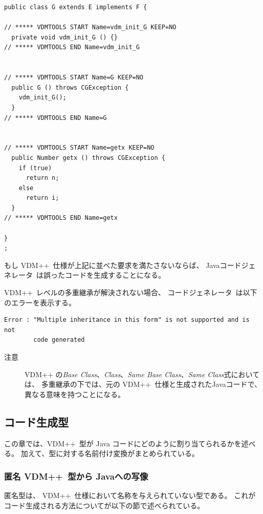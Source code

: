 \documentclass[\pformat,11pt]{jarticle}
\newcommand{\tcg}{コードジェネレータ}
\newcommand{\VDM}{VDM++}
\newcommand{\cg}{Javaコードジェネレータ}
\begin{document}
\begin{screen}
\begin{small}
\begin{verbatim}
public class G extends E implements F {

// ***** VDMTOOLS START Name=vdm_init_G KEEP=NO
  private void vdm_init_G () {}
// ***** VDMTOOLS END Name=vdm_init_G


// ***** VDMTOOLS START Name=G KEEP=NO
  public G () throws CGException {
    vdm_init_G();
  }
// ***** VDMTOOLS END Name=G


// ***** VDMTOOLS START Name=getx KEEP=NO
  public Number getx () throws CGException {
    if (true)
      return n;
    else
      return i;
  }
// ***** VDMTOOLS END Name=getx

}
;
\end{verbatim}
\end{small}
\end{screen}

もし \VDM\ 仕様が上記に並べた要求を満たさないならば、 \cg\ は誤ったコードを生成することになる。

 \VDM\ レベルの多重継承が解決されない場合、 \tcg\ は以下のエラーを表示する。
\begin{verbatim}
Error : "Multiple inheritance in this form" is not supported and is not 
        code generated
\end{verbatim}

\begin{description}
\item[注意] VDM++ の{\em Base Class}、{\em Class}、{\em Same Base Class}、{\em Same Class}式においては、
多重継承の下では、元の \VDM\ 仕様と生成されたJavaコードで、異なる意味を持つことになる。
\end{description}

\subsection{コード生成型}
\label{types}
この章では、\VDM\ 型が Java コードにどのように割り当てられるかを述べる。
加えて、型に対する名前付け変換がまとめられている。

\subsubsection{匿名 \VDM\ 型から Javaへの写像}

匿名型は、 \VDM\ 仕様において名称を与えられていない型である。
これがコード生成される方法についてが以下の節で述べられている。
\end{document}
